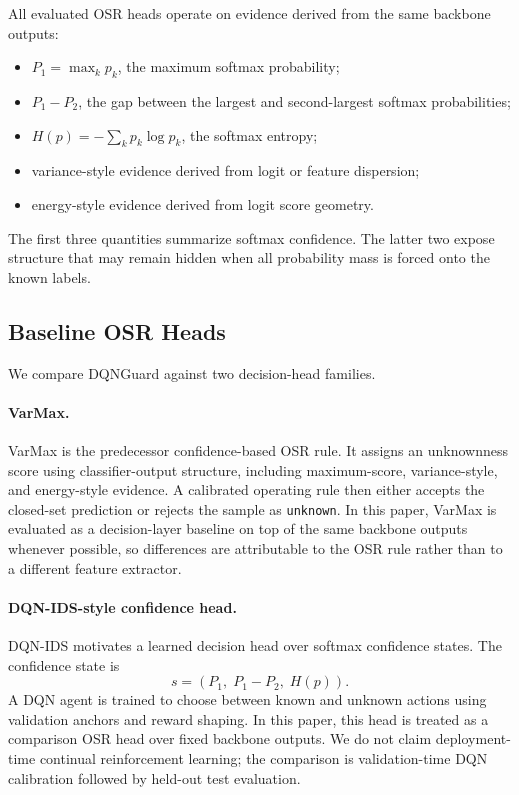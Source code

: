 All evaluated OSR heads operate on evidence derived from the same backbone outputs:
\begin{itemize}
    \item $P_1 = \max_k p_k$, the maximum softmax probability;
    \item $P_1-P_2$, the gap between the largest and second-largest softmax probabilities;
    \item $H(p)=-\sum_k p_k\log p_k$, the softmax entropy;
    \item variance-style evidence derived from logit or feature dispersion;
    \item energy-style evidence derived from logit score geometry.
\end{itemize}
The first three quantities summarize softmax confidence. The latter two expose structure that may remain hidden when all probability mass is forced onto the known labels.

\subsection{Baseline OSR Heads}
\label{subsec:baseline_osr}

We compare DQNGuard against two decision-head families.

\paragraph{VarMax.}
VarMax is the predecessor confidence-based OSR rule. It assigns an unknownness score using classifier-output structure, including maximum-score, variance-style, and energy-style evidence. A calibrated operating rule then either accepts the closed-set prediction or rejects the sample as \texttt{unknown}. In this paper, VarMax is evaluated as a decision-layer baseline on top of the same backbone outputs whenever possible, so differences are attributable to the OSR rule rather than to a different feature extractor.

\paragraph{DQN-IDS-style confidence head.}
DQN-IDS motivates a learned decision head over softmax confidence states. The confidence state is
\begin{equation}
    s = (P_1,\; P_1-P_2,\; H(p)).
\end{equation}
A DQN agent is trained to choose between known and unknown actions using validation anchors and reward shaping. In this paper, this head is treated as a comparison OSR head over fixed backbone outputs. We do not claim deployment-time continual reinforcement learning; the comparison is validation-time DQN calibration followed by held-out test evaluation.

